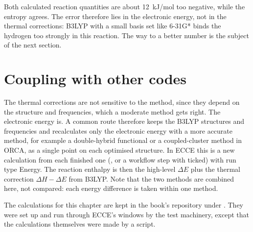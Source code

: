 Both calculated reaction quantities are about 12~kJ/mol too negative, while the entropy agrees. The error therefore lies in the electronic energy, not in the thermal corrections: B3LYP with a small basis set like 6-31G* binds the hydrogen too strongly in this reaction. The way to a better number is the subject of the next section.

\section{Coupling with other codes}
The thermal corrections are not sensitive to the method, since they depend on the structure and frequencies, which a moderate method gets right. The electronic energy is. A common route therefore keeps the B3LYP structures and frequencies and recalculates only the electronic energy with a more accurate method, for example a double-hybrid functional or a coupled-cluster method in ORCA, as a single point on each optimised structure. In ECCE this is a new calculation from each finished one (, or a workflow step with  ticked) with run type Energy. The reaction enthalpy is then the high-level $\Delta E$ plus the thermal correction $\Delta H - \Delta E$ from B3LYP. Note that the two methods are combined here, not compared: each energy difference is taken within one method.

The calculations for this chapter are kept in the book's repository under . They were set up and run through ECCE's windows by the test machinery, except that the calculations themselves were made by a script.

